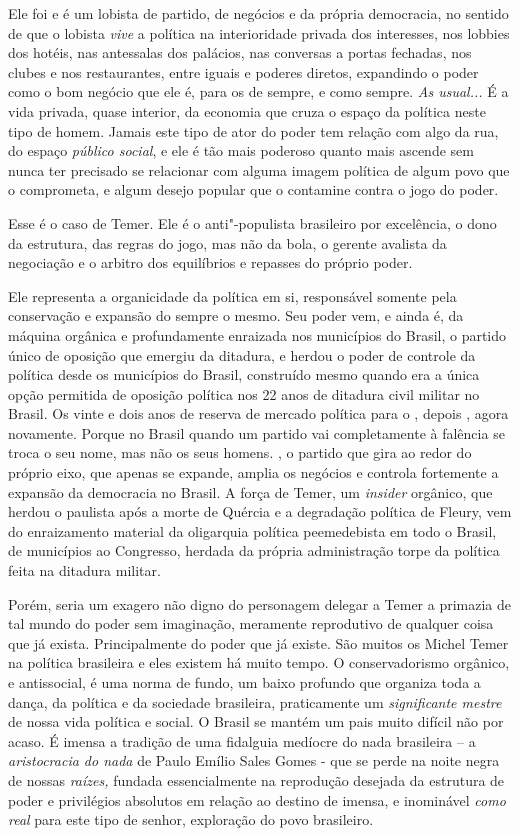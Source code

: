 Ele foi e é um lobista de partido, de negócios e da própria democracia,
no sentido de que o lobista \emph{vive} a política na interioridade
privada dos interesses, nos lobbies dos hotéis, nas antessalas dos
palácios, nas conversas a portas fechadas, nos clubes e nos
restaurantes, entre iguais e poderes diretos, expandindo o poder como o
bom negócio que ele é, para os de sempre, e como sempre. \emph{As
usual...} É a vida privada, quase interior, da economia que cruza o
espaço da política neste tipo de homem. Jamais este tipo de ator do
poder tem relação com algo da rua, do espaço \emph{público social}, e
ele é tão mais poderoso quanto mais ascende sem nunca ter precisado se
relacionar com alguma imagem política de algum povo que o comprometa, e
algum desejo popular que o contamine contra o jogo do poder.

Esse é o caso de Temer. Ele é o anti"-populista brasileiro por
excelência, o dono da estrutura, das regras do jogo, mas não da bola, o
gerente avalista da negociação e o arbitro dos equilíbrios e repasses do
próprio poder.

Ele representa a organicidade da política em si, responsável somente
pela conservação e expansão do sempre o mesmo. Seu poder vem, e ainda é,
da máquina orgânica e profundamente enraizada nos municípios do Brasil,
o partido único de oposição que emergiu da ditadura, e herdou o poder de
controle da política desde os municípios do Brasil, construído mesmo
quando era a única opção permitida de oposição política nos 22 anos de
ditadura civil militar no Brasil. Os vinte e dois anos de reserva de
mercado política para o , depois ,
agora  novamente. Porque no
Brasil quando um partido vai completamente à falência se troca o seu nome, mas não
os seus homens. , o partido que gira ao redor do próprio eixo, que
apenas se expande, amplia os negócios e controla fortemente a expansão
da democracia no Brasil. A força de Temer, um \emph{insider} orgânico,
que herdou o  paulista após a morte de Quércia e a degradação
política de Fleury, vem do enraizamento material da oligarquia política
peemedebista em todo o Brasil, de municípios ao Congresso, herdada da
própria administração torpe da política feita na ditadura militar.

Porém, seria um exagero não digno do personagem delegar a Temer a
primazia de tal mundo do poder sem imaginação, meramente reprodutivo de
qualquer coisa que já exista. Principalmente do poder que já existe. São
muitos os Michel Temer na política brasileira e eles existem há muito
tempo. O conservadorismo orgânico, e antissocial, é uma norma de fundo,
um baixo profundo que organiza toda a dança, da política e da sociedade
brasileira, praticamente um \emph{significante mestre} de nossa vida
política e social. O Brasil se mantém um pais muito difícil não por
acaso. É imensa a tradição de uma fidalguia medíocre do nada brasileira
-- a \emph{aristocracia do nada} de Paulo Emílio Sales Gomes - que se
perde na noite negra de nossas \emph{raízes,} fundada essencialmente na
reprodução desejada da estrutura de poder e privilégios absolutos em
relação ao destino de imensa, e inominável \emph{como real} para este
tipo de senhor, exploração do povo brasileiro.

